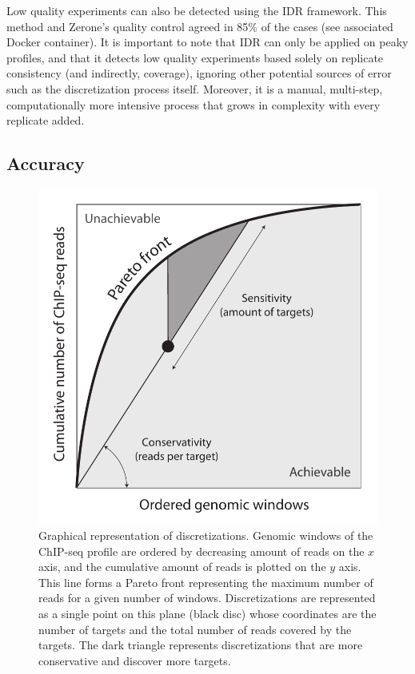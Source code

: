 \documentclass{bioinfo}
\begin{document}
Low quality experiments can also be detected using the IDR framework.
This method and Zerone's quality control agreed in 85\% of the cases
(see associated Docker container).
It is important to note that IDR can only be applied
on peaky profiles, and that it detects low quality experiments based solely on
replicate consistency (and indirectly, coverage), ignoring other potential
sources of error such as the discretization process itself.
Moreover, it is a manual, multi-step, computationally more intensive process
that grows in complexity with every replicate added.

\subsection{Accuracy}

\begin{figure}[!tpb]
\centerline{\includegraphics[scale=0.5]{pareto_front_explanation.pdf}}
\caption{
  Graphical representation of discretizations. Genomic
  windows of the ChIP-seq profile are ordered by decreasing amount of
  reads on the $x$ axis, and the cumulative amount of reads is plotted
  on the $y$ axis. This line forms a Pareto front representing the
  maximum number of reads for a given number of windows. Discretizations
  are represented as a single point on this plane (black disc) whose
  coordinates are the number of targets and the total number of reads
  covered by the targets. The dark triangle represents discretizations
  that are more conservative and discover more targets.
}
\label{fig:expl}
\end{figure}
\end{document}
